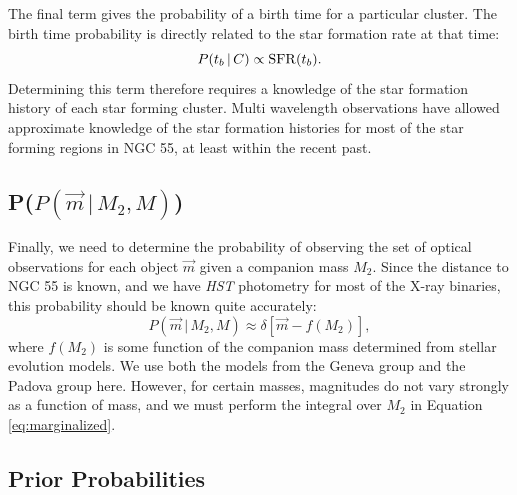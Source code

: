 \documentclass[12pt, preprint]{aastex}
\newcommand{\given}{\,|\,}
\begin{document}
The final term gives the probability of a birth time for a particular cluster. The birth time probability is directly related to the star formation rate at that time:
\begin{equation}
P(t_b \given C) \propto {\rm SFR}(t_b).
\end{equation} 
Determining this term therefore requires a knowledge of the star formation history of each star forming cluster. Multi wavelength observations have allowed approximate knowledge of the star formation histories for most of the star forming regions in NGC 55, at least within the recent past.

\subsection{P($P(\vec{m} \given M_2, M)$)}

Finally, we need to determine the probability of observing the set of optical observations for each object $\vec{m}$ given a companion mass $M_2$. Since the distance to NGC 55 is known, and we have {\it HST} photometry for most of the X-ray binaries, this probability should be known quite accurately:
\begin{equation}
P(\vec{m} \given M_2, M) \approx \delta\left[ \vec{m} - f(M_2) \right],
\end{equation}
where $f(M_2)$ is some function of the companion mass determined from stellar evolution models. We use both the models from the Geneva group and the Padova group here. However, for certain masses, magnitudes do not vary strongly as a function of mass, and we must perform the integral over $M_2$ in Equation \ref{eq:marginalized}.

 



\subsection{Prior Probabilities}
\end{document}
